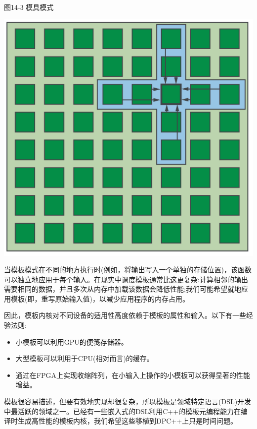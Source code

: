 \hspace*{\fill} \par %
图14-3 模具模式
\begin{center}
	\includegraphics[width=1.\textwidth]{content/chapter-14/images/3}
\end{center}

当模板模式在不同的地方执行时(例如，将输出写入一个单独的存储位置)，该函数可以独立地应用于每个输入。在现实中调度模板通常比这更复杂:计算相邻的输出需要相同的数据，并且多次从内存中加载该数据会降低性能;我们可能希望就地应用模板(即，重写原始输入值)，以减少应用程序的内存占用。\par

因此，模板内核对不同设备的适用性高度依赖于模板的属性和输入。以下有一些经验法则:\par

\begin{itemize}
	\item 小模板可以利用GPU的便笺存储器。
	\item 大型模板可以利用于CPU(相对而言)的缓存。
	\item 通过在FPGA上实现收缩阵列，在小输入上操作的小模板可以获得显著的性能增益。
\end{itemize}

模板很容易描述，但要有效地实现却很复杂，所以模板是领域特定语言(DSL)开发中最活跃的领域之一。已经有一些嵌入式的DSL利用C++的模板元编程能力在编译时生成高性能的模板内核，我们希望这些移植到DPC++上只是时间问题。\par

